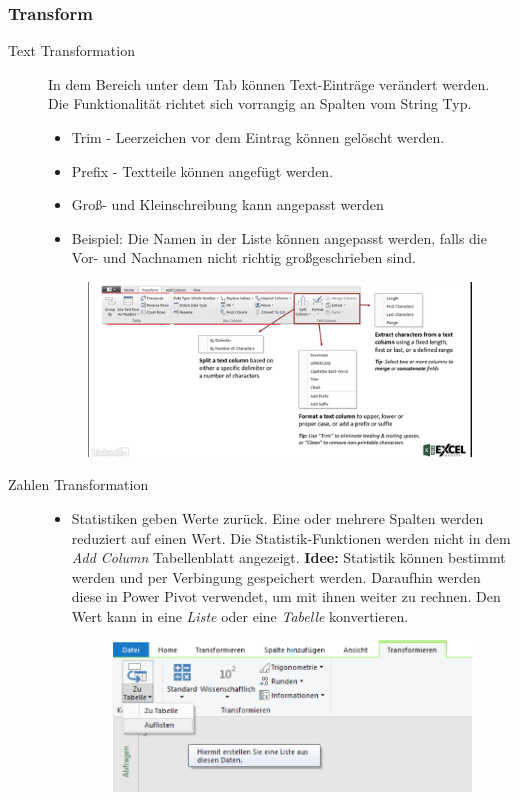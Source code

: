 \subsubsection{Transform}
\begin{description}
\item[Text Transformation] In dem Bereich unter dem Tab können Text-Einträge verändert werden. Die Funktionalität richtet sich vorrangig an Spalten vom String Typ. 
\begin{itemize}
\item Trim - Leerzeichen vor dem Eintrag können gelöscht werden.
\item Prefix - Textteile können angefügt werden.
\item Groß- und Kleinschreibung kann angepasst werden
\item Beispiel: Die Namen in der Liste können angepasst werden, falls die Vor- und Nachnamen nicht richtig großgeschrieben sind. 
\end{itemize}
\begin{figure}[H]
	\centering
	\includegraphics[scale = 0.3]{attachment/chapter_1/screenshot024}
	\caption{}
	\label{fig:screenshot024}
\end{figure}
\item[Zahlen Transformation]
\begin{itemize}
\item Statistiken geben Werte zurück. Eine oder mehrere Spalten werden reduziert auf einen Wert. Die Statistik-Funktionen werden nicht in dem \textit{Add Column} Tabellenblatt angezeigt. \textbf{Idee:} Statistik können bestimmt werden und per Verbingung gespeichert werden. Daraufhin werden diese in Power Pivot verwendet, um mit ihnen weiter zu rechnen. Den Wert kann in eine \textit{Liste} oder eine \textit{Tabelle} konvertieren.
\begin{figure}[H]
	\centering
	\includegraphics[scale = 0.3]{attachment/chapter_1/screenshot026}

\end{figure}
\end{itemize}
\end{description}
